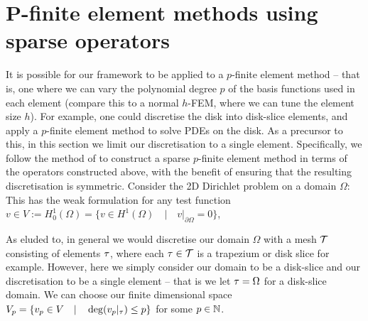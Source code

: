 %


\section{P-finite element methods using sparse operators}\label{section:ds:PFEM}

It is possible for our framework to be applied to a $p$-finite element method -- that is, one where we can vary the polynomial degree $p$ of the basis functions used in each element (compare this to a normal $h$-FEM, where we can tune the element size $h$). For example, one could discretise the disk into disk-slice elements, and apply a $p$-finite element method to solve PDEs on the disk. As a precursor to this, in this section we limit our discretisation to a single element. Specifically, we follow the method of \cite{beuchler2006new} to construct a sparse $p$-finite element method in terms of the operators constructed above, with the benefit of ensuring that the resulting discretisation is symmetric. Consider the 2D Dirichlet problem on a domain $\Omega$:
This has the weak formulation for any test function $v \in V := H_0^1(\Omega) = \{v \in H^1(\Omega) \quad | \quad v|_{\partial \Omega} = 0 \}$,

As eluded to, in general we would discretise our domain $\Omega$ with a mesh $\mathcal{T}$ consisting of elements $\tau$, where each $\tau \in \mathcal{T}$ is a trapezium or disk slice for example. However, here we simply consider our domain to be a disk-slice and our discretisation to be a single element -- that is we let $\tau = \Omega$ for a disk-slice domain. We can choose our finite dimensional space $V_p = \{ v_p \in V \quad | \quad \deg(v_p|_\tau) \le p \}$ for some $p \in \mathbb{N}$.

